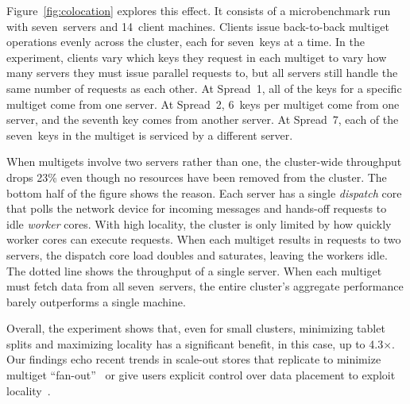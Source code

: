 Figure~\ref{fig:colocation} explores this effect. It consists of a
microbenchmark run with seven~servers and 14~client machines. Clients issue back-to-back
multiget operations evenly across the cluster, each for seven~keys at a time. In
the experiment, clients vary which keys they request in each multiget to vary
how many servers they must issue parallel requests to, but all servers still
handle the same number of requests as each other.
At Spread~1, all of the keys for a specific multiget come from one server. At
Spread~2, 6~keys per multiget come from one server, and the
seventh key comes from another server. At Spread~7, each of the
seven~keys in the multiget is serviced by a different server.

When multigets involve two servers rather than one, the cluster-wide throughput
drops 23\% even though no resources have been removed from the cluster. The
bottom half of the figure shows the reason.  Each server has a single {\em dispatch}
core that polls the network device for incoming messages and hands-off requests
to idle {\em worker} cores.  With high locality, the cluster is only limited by
how quickly worker cores can execute requests. When each multiget results in
requests to two servers, the dispatch core load doubles and saturates, leaving
the workers idle. The dotted line shows the throughput of a single server.
When each multiget must fetch data from all seven~servers, the entire
cluster's aggregate performance barely outperforms a single machine.

Overall, the experiment shows that, even for small clusters, minimizing tablet
splits and maximizing locality has a significant benefit, in this case, up to
4.3$\times$.  Our findings echo recent trends in scale-out stores that
replicate to minimize multiget ``fan-out''~\cite{fb-memcache} or give users
explicit control over data placement to exploit locality~\cite{spanner}.

